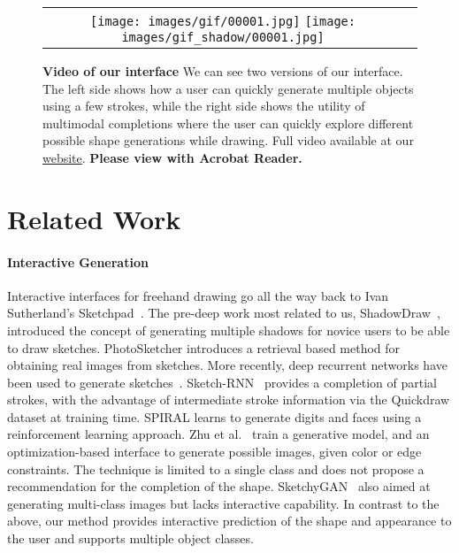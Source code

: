 \begin{figure*}[t]
	\centering  
	\begin{tabular}{cc}
		\texttt{[image: images/gif/00001.jpg]} \hspace{4pt}
		\texttt{[image: images/gif\_shadow/00001.jpg]} 
		\\
	\end{tabular}
	\caption{{\bf Video of our interface} We can see two versions of our interface. The left side shows how a user can quickly generate multiple objects using a few strokes, while the right side shows the utility of multimodal completions where the user can quickly explore different possible shape generations while drawing. Full video available at our \href{https://arnabgho.github.io/iSketchNFill/}{website}. { \textbf{Please view with Acrobat Reader.}}}\label{fig:gui}
\end{figure*}


\section{Related Work}

\paragraph{Interactive Generation} Interactive interfaces for freehand drawing go all the way back to Ivan Sutherland's Sketchpad~\cite{sutherland64}.  The pre-deep work most related to us, ShadowDraw~\cite{lee2011shadowdraw}, introduced the concept of generating multiple shadows for novice users to be able to draw sketches. PhotoSketcher \cite{eitz2011photosketcher} introduces a retrieval based method for obtaining real images from sketches. %
More recently, deep recurrent networks have been used to generate sketches~\cite{ha2017neural,ganin2018synthesizing}. Sketch-RNN~\cite{ha2017neural} provides a completion of partial strokes, with the advantage of intermediate stroke information via the Quickdraw dataset at training time. SPIRAL \cite{ganin2018synthesizing} learns to generate digits and faces using a reinforcement learning approach.
Zhu et al.~\cite{zhu2016generative} train a generative model, and an optimization-based interface to generate possible images, given color or edge constraints. The technique is limited to a single class and does not propose a recommendation for the completion of the shape. SketchyGAN~\cite{chen2018sketchygan} also aimed at generating multi-class images but lacks interactive capability. In contrast to the above, our method provides interactive prediction of the shape and appearance to the user and supports multiple object classes.
